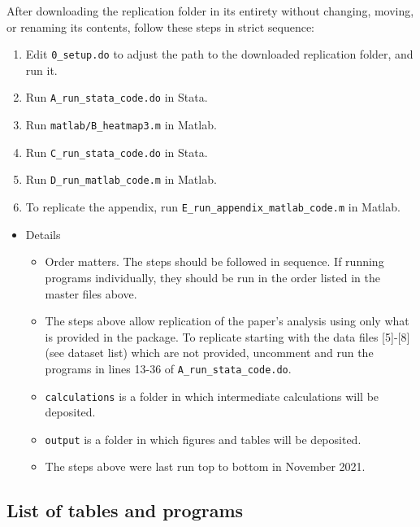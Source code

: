 \documentclass[12pt,english]{article}
\begin{document}
	After downloading the replication folder in its entirety without changing,
	moving, or renaming its contents, follow these steps in strict sequence:
	\begin{enumerate}
		\item Edit \texttt{0\_setup.do} to adjust the path to the downloaded replication
		folder, and run it.
		\item Run \texttt{A\_run\_stata\_code.do} in Stata.
		\item Run \texttt{matlab/B\_heatmap3.m} in Matlab.
		\item Run \texttt{C\_run\_stata\_code.do} in Stata.
		\item Run \texttt{D\_run\_matlab\_code.m} in Matlab.
		\item To replicate the appendix, run \texttt{E\_run\_appendix\_matlab\_code.m} in Matlab.
	\end{enumerate}
	\begin{itemize}
		\item Details
		\begin{itemize}
			\item Order matters. The steps should be followed in sequence. If running
			programs individually, they should be run in the order listed in the
			master files above.
			\item The steps above allow replication of the paper's analysis using only
			what is provided in the package. To replicate starting with the data
			files {[}5{]}-{[}8{]} (see dataset list) which are not provided, uncomment
			and run the programs in lines 13-36 of \texttt{A\_run\_stata\_code.do}.
			\item \texttt{calculations} is a folder in which intermediate calculations
			will be deposited.
			\item \texttt{output} is a folder in which figures and tables will be deposited.
			\item The steps above were last run top to bottom in November 2021.
		\end{itemize}
	\end{itemize}
	
	\subsection*{List of tables and programs}
\end{document}
